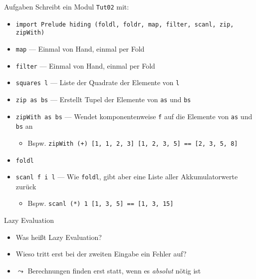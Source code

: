 \documentclass{beamer}
\begin{document}
\begin{frame}{Aufgaben}
	Schreibt ein Modul \texttt{Tut02} mit:

	\begin{itemize}
		\item \texttt{import Prelude hiding (foldl, foldr, map, filter, scanl, zip, zipWith)}
		\item \texttt{map} --- Einmal von Hand, einmal per Fold
		\item \texttt{filter} --- Einmal von Hand, einmal per Fold
		\item \texttt{squares l} --- Liste der Quadrate der Elemente von \texttt{l}
		\item \texttt{zip as bs} --- Erstellt Tupel der Elemente von \texttt{as} und \texttt{bs}
		\item \texttt{zipWith as bs} --- Wendet komponentenweise \texttt{f} auf die Elemente von \texttt{as} und \texttt{bs} an
		\begin{itemize}
			\item Bspw. \texttt{zipWith (+) [1, 1, 2, 3] [1, 2, 3, 5] == [2, 3, 5, 8]}
		\end{itemize}
   		\pause
		\item \texttt{foldl}
		\item \texttt{scanl f i l} --- Wie \texttt{foldl}, gibt aber eine Liste aller Akkumulatorwerte zurück
		\begin{itemize}
			\item Bspw. \texttt{scanl (*) 1 [1, 3, 5] == [1, 3, 15]}
		\end{itemize}
	\end{itemize}
\end{frame}

\begin{frame}{Lazy Evaluation}

	\begin{itemize}
		\item Was heißt Lazy Evaluation?
		\item Wieso tritt erst bei der zweiten Eingabe ein Fehler auf?
		\pause
		\item $\leadsto$ Berechnungen finden erst statt, wenn es \emph{absolut} nötig ist
	\end{itemize}
\end{frame}
\end{document}
